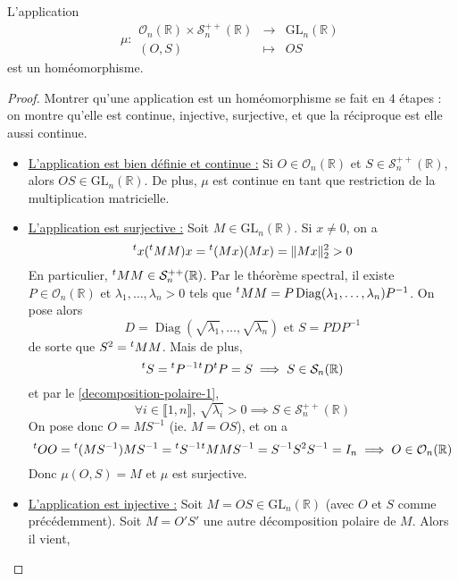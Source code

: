 
  \begin{theorem}
    L'application
    \[ \mu :
    \begin{array}{ccc}
      \mathcal{O}_n(\mathbb{R}) \times \mathcal{S}_n^{++}(\mathbb{R}) &\rightarrow& \mathrm{GL}_n(\mathbb{R}) \\
      (O, S) &\mapsto& OS
    \end{array}
    \]
    est un homéomorphisme.
  \end{theorem}

  \begin{proof}
    Montrer qu'une application est un homéomorphisme se fait en $4$ étapes : on montre qu'elle est continue, injective, surjective, et que la réciproque est elle aussi continue.
    \begin{itemize}
      \item \uline{L'application est bien définie et continue :} Si $O \in \mathcal{O}_n(\mathbb{R})$ et $S \in \mathcal{S}_n^{++}(\mathbb{R})$, alors $OS \in \mathrm{GL}_n(\mathbb{R})$. De plus, $\mu$ est continue en tant que restriction de la multiplication matricielle.
      \item \uline{L'application est surjective :} Soit $M \in \mathrm{GL}_n(\mathbb{R})$. Si $x \neq 0$, on a
      \[ \mathstrut ^t x (\mathstrut ^t M M) x = \mathstrut ^t (Mx) (Mx) = \Vert Mx \Vert_2^2 > 0 \]
      En particulier, $\mathstrut ^t M M \in \mathcal{S}_n^{++}(\mathbb{R})$. Par le théorème spectral, il existe $P \in \mathcal{O}_n(\mathbb{R})$ et $\lambda_1, \dots, \lambda_n > 0$ tels que $\mathstrut ^t M M = P \operatorname{Diag}(\lambda_1, \dots, \lambda_n) P^{-1}$. On pose alors
      \[ D = \operatorname{Diag} \left(\sqrt{\lambda_1}, \dots, \sqrt{\lambda_n} \right) \text{ et } S = P D P^{-1} \]
      de sorte que $S^2 = \mathstrut ^t M M$. Mais de plus,
      \[ \mathstrut ^t S = \mathstrut ^t P^{-1} \mathstrut ^t D \mathstrut ^t P = S \implies S \in \mathcal{S}_n(\mathbb{R}) \]
      et par le \cref{decomposition-polaire-1},
      \[ \forall i \in \llbracket 1, n \rrbracket, \, \sqrt{\lambda_i} > 0 \implies S \in \mathcal{S}_n^{++}(\mathbb{R}) \]
      On pose donc $O = MS^{-1}$ (ie. $M = OS$), et on a
      \[ \mathstrut ^t O O = \mathstrut ^t (MS^{-1}) MS^{-1} = \mathstrut ^t S^{-1} \mathstrut ^t M M S^{-1} = S^{-1} S^2 S^{-1} = I_n \implies O \in \mathcal{O}_n(\mathbb{R}) \]
      Donc $\mu(O, S) = M$ et $\mu$ est surjective.
      \item \uline{L'application est injective :} Soit $M = OS \in \mathrm{GL}_n(\mathbb{R})$ (avec $O$ et $S$ comme précédemment). Soit $M = O'S'$ une autre décomposition polaire de $M$. Alors il vient,

\end{itemize}
\end{proof}
